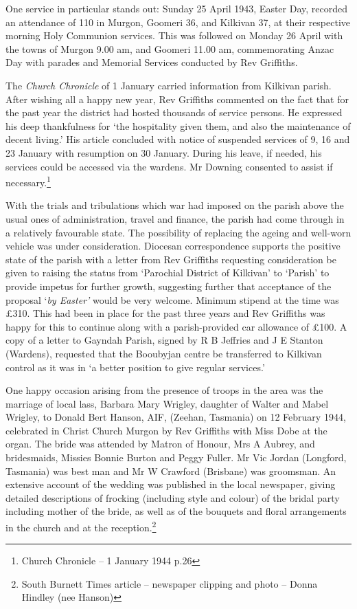 One service in particular stands out: Sunday 25 April 1943, Easter Day, recorded an attendance of 110 in Murgon, Goomeri 36, and Kilkivan 37, at their respective morning Holy Communion services. This was followed on Monday 26 April with the towns of Murgon 9.00 am, and Goomeri 11.00 am, commemorating Anzac Day with parades and Memorial Services conducted by Rev Griffiths.

The \emph{Church Chronicle} of 1 January carried information from Kilkivan parish. After wishing all a happy new year, Rev Griffiths commented on the fact that for the past year the district had hosted thousands of service persons. He expressed his deep thankfulness for `the hospitality given them, and also the maintenance of decent living.' His article concluded with notice of suspended services of 9, 16 and 23 January with resumption on 30 January. During his leave, if needed, his services could be accessed via the wardens. Mr Downing consented to assist if necessary.\footnote{Church Chronicle -- 1 January 1944 p.26}

With the trials and tribulations which war had imposed on the parish above the usual ones of administration, travel and finance, the parish had come through in a relatively favourable state. The possibility of replacing the ageing and well-worn vehicle was under consideration. Diocesan correspondence supports the positive state of the parish with a letter from Rev Griffiths requesting consideration be given to raising the status from `Parochial District of Kilkivan' to `Parish' to provide impetus for further growth, suggesting further that acceptance of the proposal `\emph{by Easter'} would be very welcome. Minimum stipend at the time was £310. This had been in place for the past three years and Rev Griffiths was happy for this to continue along with a parish-provided car allowance of £100. A copy of a letter to Gayndah Parish, signed by R B Jeffries and J E Stanton (Wardens), requested that the Booubyjan centre be transferred to Kilkivan control as it was in `a better position to give regular services.'

One happy occasion arising from the presence of troops in the area was the marriage of local lass, Barbara Mary Wrigley, daughter of Walter and Mabel Wrigley, to Donald Bert Hanson, AIF, (Zeehan, Tasmania) on 12 February 1944, celebrated in Christ Church Murgon by Rev Griffiths with Miss Dobe at the organ. The bride was attended by Matron of Honour, Mrs A Aubrey, and bridesmaids, Missies Bonnie Burton and Peggy Fuller. Mr Vic Jordan (Longford, Tasmania) was best man and Mr W Crawford (Brisbane) was groomsman. An extensive account of the wedding was published in the local newspaper, giving detailed descriptions of frocking (including style and colour) of the bridal party including mother of the bride, as well as of the bouquets and floral arrangements in the church and at the reception.\footnote{South Burnett Times article -- newspaper clipping and photo -- Donna Hindley (nee Hanson)}

